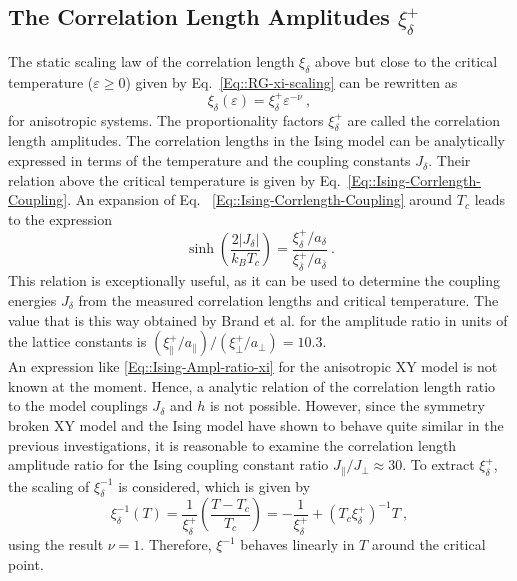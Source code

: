 	\subsection{The Correlation Length Amplitudes ${\xi_\delta^+}$}
	The static scaling law of the correlation length $\xi_\delta$ above but close to the critical temperature ($\varepsilon \geq 0$) given by Eq.~\eqref{Eq::RG-xi-scaling} can be rewritten as
	\begin{equation} \label{Eq::Xi-divergence-amplitude}
		\xi_\delta (\varepsilon) = \xi_\delta^{+} \varepsilon^{-\nu}~,
	\end{equation}
	for anisotropic systems. The proportionality factors $\xi_\delta^{+}$ are called the correlation length amplitudes. The correlation lengths in the Ising model can be analytically expressed in terms of the temperature and the coupling constants $J_\delta$. Their relation above the critical temperature is given by Eq.~\eqref{Eq::Ising-Corrlength-Coupling}. An expansion of Eq.~ \eqref{Eq::Ising-Corrlength-Coupling} around $T_c$ leads to the expression
	\begin{equation} \label{Eq::Ising-Ampl-ratio-xi}
		\sinh \left(\frac{2 |J_\delta|}{k_B T_c}\right) =	\frac{\xi_\delta^+ / a_\delta}{\xi_{\overline{\delta}}^+ / a_{\overline{\delta}}}~.
	\end{equation}
	This relation is exceptionally useful, as it can be used to determine the coupling energies $J_\delta$ from the measured correlation lengths and critical temperature. The value that is this way obtained by Brand et al. \cite{brand2023dimer, brand2023critical} for the amplitude ratio in units of the lattice constants is $({\xi_\parallel^+ / a_\parallel}) \big/	({\xi_{\perp}^+ / a_{\perp}}) =	10.3$.  \\
	
	An expression like \eqref{Eq::Ising-Ampl-ratio-xi} for the anisotropic XY model is not known at the moment. Hence, a analytic relation of the correlation length ratio to the model couplings $J_\delta$ and $h$ is not possible. However, since the symmetry broken XY model and the Ising model have shown to behave quite similar in the previous investigations, it is reasonable to examine the correlation length amplitude ratio for the Ising coupling constant ratio $J_\parallel /	J_\perp \approx	30$. To extract $\xi^+_\delta$, the scaling of $\xi_\delta^{-1}$ is considered, which is given by
	\begin{equation} \label{Eq::inv-divergence-fit}
		\xi_\delta^{-1}(T) =	\frac{1}{\xi_\delta^+} \left(\frac{T - T_c}{T_c}\right) =	- \frac{1}{\xi_\delta^+} + (T_c \xi_\delta^+)^{-1} T ~,
	\end{equation}
	using the result $\nu =	1$. Therefore, $\xi^{-1}$ behaves linearly in $T$ around the critical point.\\
	
